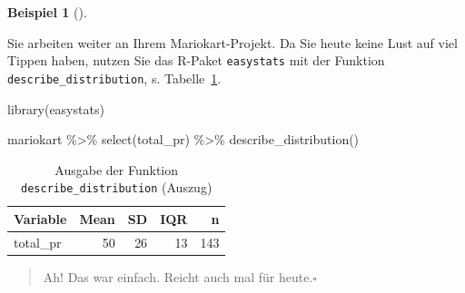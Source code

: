 \documentclass[
  letterpaper,
]{scrbook}
\newenvironment{Shaded}{\begin{snugshade}}{\end{snugshade}}
\newcommand{\FunctionTok}[1]{\textcolor[rgb]{0.28,0.35,0.67}{#1}}
\newcommand{\NormalTok}[1]{\textcolor[rgb]{0.00,0.23,0.31}{#1}}
\newcommand{\SpecialCharTok}[1]{\textcolor[rgb]{0.37,0.37,0.37}{#1}}
\theoremstyle{definition}
\newtheorem{example}{Beispiel}[chapter]
\theoremstyle{definition}
\theoremstyle{definition}
\theoremstyle{remark}
\begin{document}
\begin{example}[]\protect\hypertarget{exm-sd-mario}{}\label{exm-sd-mario}

Sie arbeiten weiter an Ihrem Mariokart-Projekt. Da Sie heute keine Lust
auf viel Tippen haben, nutzen Sie das R-Paket \texttt{easystats} mit der
Funktion \texttt{describe\_distribution}, s.
Tabelle~\ref{tbl-describe-dist1}.

\begin{Shaded}
\begin{Highlighting}[]
\FunctionTok{library}\NormalTok{(easystats)}

\NormalTok{mariokart }\SpecialCharTok{\%\textgreater{}\%} 
  \FunctionTok{select}\NormalTok{(total\_pr) }\SpecialCharTok{\%\textgreater{}\%} 
  \FunctionTok{describe\_distribution}\NormalTok{()}
\end{Highlighting}
\end{Shaded}

\begin{longtable}[]{@{}lrrrr@{}}

\caption{\label{tbl-describe-dist1}Ausgabe der Funktion
\texttt{describe\_distribution} (Auszug)}

\tabularnewline

\toprule\noalign{}
Variable & Mean & SD & IQR & n \\
\midrule\noalign{}
\endhead
\bottomrule\noalign{}
\endlastfoot
total\_pr & 50 & 26 & 13 & 143 \\

\end{longtable}

\begin{quote}
{} Ah! Das war einfach. Reicht auch mal für
heute.\(\square\)
\end{quote}

\end{example}
\end{document}

